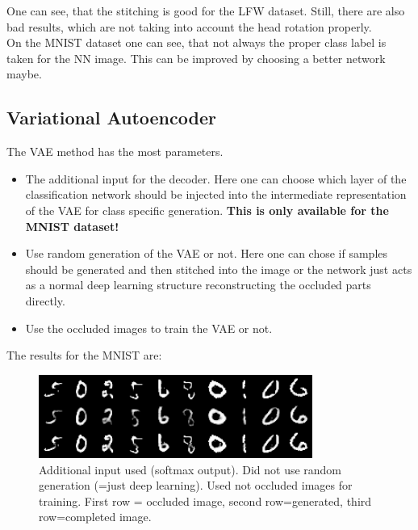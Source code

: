 \documentclass[
     11pt,         %
     a4paper,      %
     oneside,
     ]{article}
\begin{document}
One can see, that the stitching is good for the LFW dataset. Still, there are also bad results, which are not taking into account the head rotation properly.\\
On the MNIST dataset one can see, that not always the proper class label is taken for the NN image. This can be improved by choosing a better network maybe.

\subsection{Variational Autoencoder}
The VAE method has the most parameters.
\begin{itemize}
  \item The additional input for the decoder. Here one can choose which layer of the classification network should be injected into the intermediate representation of the VAE for class specific generation. \textbf{This is only available for the MNIST dataset!}
  \item Use random generation of the VAE or not. Here one can chose if samples should be generated and then stitched into the image or the network just acts as a normal deep learning structure reconstructing the occluded parts directly.
  \item Use the occluded images to train the VAE or not.
\end{itemize}
The results for the MNIST are:
\begin{figure}[H]
  \begin{center}
    \includegraphics[width=0.8\textwidth]{presentation_results/VAE/MNIST-VAE-useRandom_false-useMNIST_true-VAERepresentation_3-useOccludedForTrain_false.png}
    \caption{Additional input used (softmax output). Did not use random generation (=just deep learning). Used not occluded images for training. First row = occluded image, second row=generated, third row=completed image.}
  \end{center}
\end{figure}
\end{document}

